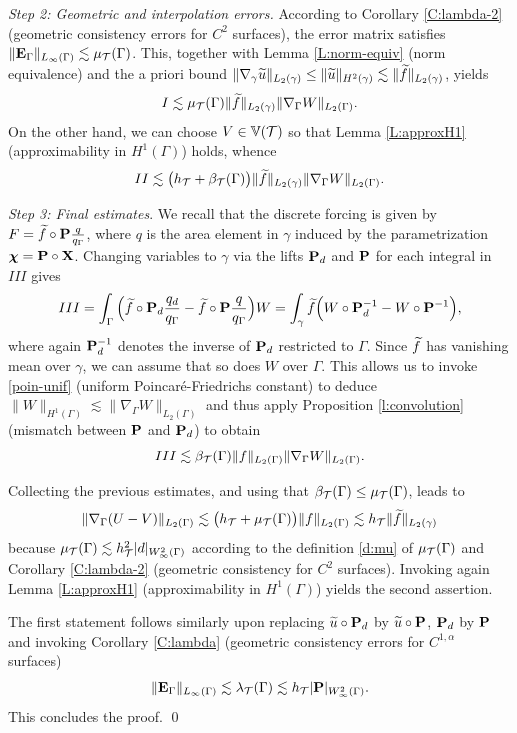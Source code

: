 \medskip\noindent
{\it Step 2: Geometric and interpolation errors.}
According to Corollary \ref{C:lambda-2} (geometric consistency errors for $C^2$ surfaces),
the error matrix satisfies $\|{\bf E}_\Gamma\|_{L_\infty(\Gamma)} \lesssim \mu_{\mathcal{T}}(\Gamma)$. This,
together with Lemma \ref{L:norm-equiv} (norm equivalence) and the a priori
bound $\|\nabla_\gamma \widetilde{u}\|_{L_2(\gamma)} \le \|\widetilde{u}\|_{H^2(\gamma)} \lesssim \|\widetilde{f}\|_{L_2(\gamma)}$, yields
%
\[
I \lesssim \mu_{\mathcal{T}}(\Gamma) \|\widetilde{f}\|_{L_2(\gamma)} \|\nabla_\Gamma W\|_{L_2(\Gamma)}.
\]
%
On the other hand, we can choose $V\in\mathbb{V}(\mathcal{T})$ so that Lemma \ref{L:approxH1}
(approximability in $H^1(\Gamma)$) holds, whence
%
\[
II \lesssim \big(h_{\mathcal{T}} + \beta_{\mathcal{T}}(\Gamma) \big) \|\widetilde{f}\|_{L_2(\gamma)}
\|\nabla_\Gamma W\|_{L_2(\Gamma)}.
\]

\medskip\noindent
{\it Step 3: Final estimates}.
We recall that the discrete forcing is given by $F = \widetilde{f} \circ {\bf P} \frac{q}{q_\Gamma}$,
where $q$ is the area element in $\gamma$ induced by the parametrization
${\boldsymbol \chi} = {\bf P} \circ {\bf X}$. Changing variables to $\gamma$ via the lifts
${\bf P}_d$ and ${\bf P}$ for each integral in $III$ gives
%
\[
III = \int_\Gamma \Big(\widetilde{f} \circ {\bf P}_d \frac{q_d}{q_\Gamma}
- \widetilde{f} \circ {\bf P} \frac{q}{q_\Gamma} \Big) W
= \int_\gamma \widetilde{f} \Big( W\circ {\bf P}_d^{-1} - W \circ {\bf P}^{-1} \Big),
\]
%
where again ${\bf P}_d^{-1}$ denotes the inverse of ${\bf P}_d$ restricted to $\Gamma$.
%
Since $\widetilde{f}$ has vanishing mean over $\gamma$, we can assume that so does $W$
over $\Gamma$. This allows us to invoke \eqref{poin-unif} (uniform Poincar\'e-Friedrichs
constant) to deduce $\|W\|_{H^1(\Gamma)} \lesssim \|\nabla_\Gamma W\|_{L_2(\Gamma)}$
and thus apply Proposition \ref{l:convolution} (mismatch between ${\bf P}$ and ${\bf P}_d$)
to obtain
%
\[
III \lesssim  \beta_{\mathcal{T}}(\Gamma) \| f \|_{L_2(\Gamma)} \|\nabla_\Gamma W\|_{L_2(\Gamma)}.
\]

Collecting the previous estimates, and using that
$\beta_{\mathcal{T}}(\Gamma)\le\mu_{\mathcal{T}}(\Gamma)$, leads to
%
\[
\|\nabla_\Gamma (U-V)\|_{L_2(\Gamma)} \lesssim \big(h_{\mathcal{T}} + \mu_{\mathcal{T}}(\Gamma) \big)
\|f\|_{L_2(\Gamma)} \lesssim h_{\mathcal{T}} \|\widetilde{f}\|_{L_2(\gamma)}
\]
%
because $\mu_{\mathcal{T}}(\Gamma) \lesssim h_{\mathcal{T}}^2 |d|_{W^2_\infty(\Gamma)}$ according to the
definition \eqref{d:mu} of $\mu_{\mathcal{T}}(\Gamma)$ and Corollary \ref{C:lambda-2}
(geometric consistency for $C^2$ surfaces). Invoking again Lemma \ref{L:approxH1}
(approximability in $H^1(\Gamma)$) yields the second assertion.
    
The first statement follows similarly upon replacing $\widetilde u\circ{\bf P}_d$ by
$\widetilde u \circ {\bf P}$, ${\bf P}_d$ by ${\bf P}$ and invoking Corollary \ref{C:lambda}
(geometric consistency errors for $C^{1,\alpha}$ surfaces)
$$
\| {\bf E}_{\Gamma} \|_{L_\infty(\Gamma)}  \lesssim \lambda_{\mathcal{T}}(\Gamma)
\lesssim h_{\mathcal{T}} |{\bf P}|_{W^2_\infty (\Gamma)}.
$$
This concludes the proof.
\qed

